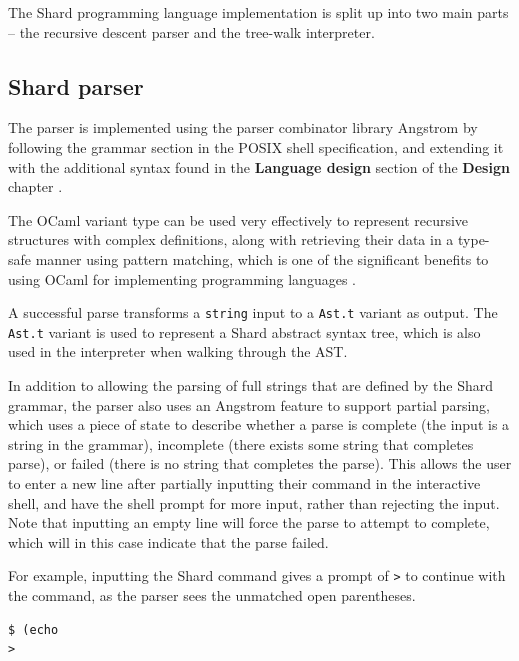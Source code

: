 \documentclass[oneside]{report}
\begin{document}
The Shard programming language implementation is split up into two main parts -- the recursive descent parser and the tree-walk interpreter.

\subsection{Shard parser}

The parser is implemented using the parser combinator library Angstrom by following the grammar section in the POSIX shell specification, and extending it with the additional syntax found in the \textbf{Language design} section of the \textbf{Design} chapter \cite{ocamlangstrom} \cite{posix2017}.

The OCaml variant type can be used very effectively to represent recursive structures with complex definitions, along with retrieving their data in a type-safe manner using pattern matching, which is one of the significant benefits to using OCaml for implementing programming languages \cite{realworldocaml}.

A successful parse transforms a \texttt{string} input to a \texttt{Ast.t} variant as output. The \texttt{Ast.t} variant is used to represent a Shard abstract syntax tree, which is also used in the interpreter when walking through the AST.

In addition to allowing the parsing of full strings that are defined by the Shard grammar, the parser also uses an Angstrom feature to support partial parsing, which uses a piece of state to describe whether a parse is complete (the input is a string in the grammar), incomplete (there exists some string that completes parse), or failed (there is no string that completes the parse).
This allows the user to enter a new line after partially inputting their command in the interactive shell, and have the shell prompt for more input, rather than rejecting the input.
Note that inputting an empty line will force the parse to attempt to complete, which will in this case indicate that the parse failed.

For example, inputting the Shard command gives a prompt of \texttt{>} to continue with the command, as the parser sees the unmatched open parentheses.

\begin{minipage}[c]{\textwidth-15pt}
  \begin{lstlisting}[language=shard]
$ (echo
>
\end{lstlisting}
  \smallskip
\end{minipage}
\end{document}
